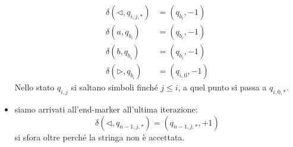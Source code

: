\documentclass[12pt, answers]{exam}
\begin{document}
\begin{questions}
\begin{parts}
\begin{solution}
\begin{itemize}
					\begin{align*}
						\delta(\lhd, q_{i, j, *}) &= (q_{b_i}, -1) \\
						\delta(a, q_{b_i}) &= (q_{b_i}, -1) \\
						\delta(b, q_{b_i}) &= (q_{b_i}, -1) \\
						\delta(\rhd, q_{b_i}) &= (q_{i,0}, -1)
					\end{align*}
					Nello stato $q_{i, j}$ si saltano simboli finché $j \leq i$, a quel punto si passa a $q_{i, 0, *}$.
				\item siamo arrivati all'end-marker all'ultima iterazione: 
					$$ \delta(\lhd, q_{n - 1, j, *}) = (q_{n - 1, j, *}, +1) $$
					si sfora oltre perché la stringa non è accettata.
			\end{itemize}

\end{solution}
\end{parts}
\end{questions}
\end{document}
